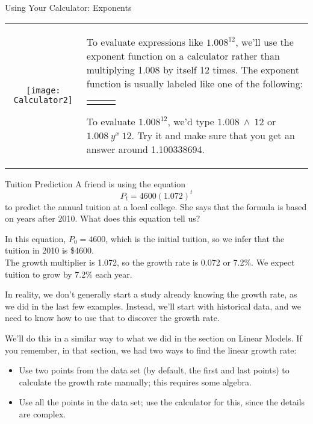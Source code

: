 \begin{proc}{Using Your Calculator: Exponents}
\begin{tabular}{c l}
\texttt{[image: Calculator2]} & \parbox[b]{3in}{To evaluate expressions like $1.008^{12}$, we'll use the exponent function on a calculator rather than multiplying 1.008 by itself 12 times.  The exponent function is usually labeled like one of the following:
\begin{center}
\begin{tabular}{c c c}
$\boxed{\wedge}$ & $\boxed{y^x}$ & $\boxed{x^y}$
\end{tabular}
\end{center}

To evaluate $1.008^{12}$, we'd type $1.008 \ \boxed{\wedge}\ 12$ or $1.008\ \boxed{y^x}\ 12$.  Try it and make sure that you get an answer around 1.100338694.}
\end{tabular}
\end{proc}
\pagebreak

\begin{example}[https://www.youtube.com/watch?v=_u9RlZX_BkI]{Tuition Prediction}
A friend is using the equation \[P_t = 4600(1.072)^t\] to predict the annual tuition at a local college.  She says that the formula is based on years after 2010.  What does this equation tell us?

\sol
In this equation, $P_0 = 4600$, which is the initial tuition, so we infer that the tuition in 2010 is \$4600.\\

The growth multiplier is 1.072, so the growth rate is 0.072 or 7.2\%.  We expect tuition to grow by 7.2\% each year.
\end{example}

In reality, we don't generally start a study already knowing the growth rate, as we did in the last few examples.  Instead, we'll start with historical data, and we need to know how to use that to discover the growth rate.

We'll do this in a similar way to what we did in the section on Linear Models.  If you remember, in that section, we had two ways to find the linear growth rate:
\begin{itemize}
\item Use two points from the data set (by default, the first and last points) to calculate the growth rate manually; this requires some algebra.
\item Use all the points in the data set; use the calculator for this, since the details are complex.
\end{itemize}

